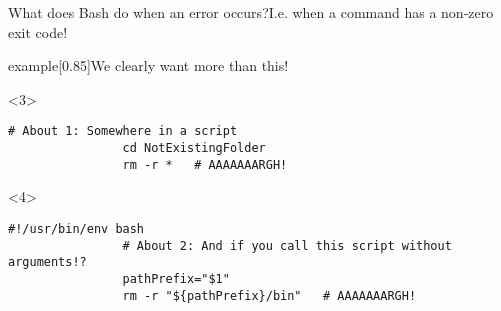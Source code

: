 \begin{frame}[fragile]{What does Bash do when an error occurs?}{I.e. when a command has a non-zero exit code!}
\begin{overlayarea}{\textwidth}{0.7\textheight}
\begin{varblock}{example}[0.85\textwidth]{We clearly want more than this!}
\begin{enumerate}
            \end{enumerate}
        \end{varblock}
        \begin{onlyenv}<3>
            \begin{lstlisting}[style=myBash, numbers=none, aboveskip=3mm]
                # About 1: Somewhere in a script
                cd NotExistingFolder
                rm -r *   # AAAAAAARGH!
            \end{lstlisting}
        \end{onlyenv}
        \begin{onlyenv}<4>
            \begin{lstlisting}[style=myBash, numbers=none, aboveskip=3mm]
                #!/usr/bin/env bash
                # About 2: And if you call this script without arguments!?
                pathPrefix="$1"
                rm -r "${pathPrefix}/bin"   # AAAAAAARGH!
            \end{lstlisting}
        \end{onlyenv}
    \end{overlayarea}
\end{frame}
